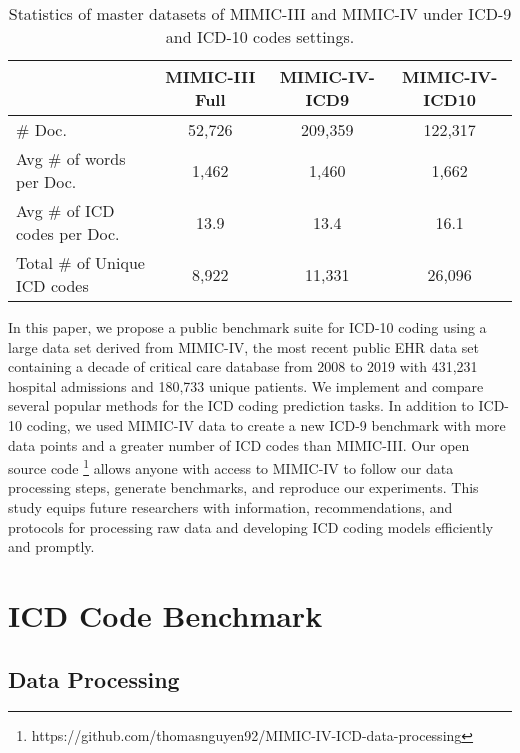 \documentclass[11pt]{article}
\begin{document}
\begin{table*}[ht]
    \centering
    \small
    \begin{tabular}{lccc}
    \toprule
    & MIMIC-III Full & MIMIC-IV-ICD9 & MIMIC-IV-ICD10  \\
    \midrule
    \# Doc. & 52,726 & 209,359 & 122,317 \\
    Avg \# of words per Doc. & 1,462 & 1,460 & 1,662 \\
    Avg \# of ICD codes per Doc. & 13.9 & 13.4 & 16.1 \\ 
    Total \# of Unique ICD codes & 8,922 & 11,331 & 26,096 \\        
    \bottomrule
    
    \end{tabular}
    \caption{Statistics of master datasets of MIMIC-III and MIMIC-IV under ICD-9 and ICD-10 codes settings.}
    \label{tab: statistics-master-dataset}
\end{table*}

In this paper, we propose a public benchmark suite for ICD-10 coding using a large data set derived from MIMIC-IV, the most recent public EHR data set containing a decade of critical care database from 2008 to 2019 with 431,231 hospital admissions and 180,733 unique patients. We implement and compare several popular methods for the ICD coding prediction tasks. In addition to ICD-10 coding, we used MIMIC-IV data to create a new ICD-9 benchmark with more data points and a greater number of ICD codes than MIMIC-III. Our open source code \footnote{https://github.com/thomasnguyen92/MIMIC-IV-ICD-data-processing} allows anyone with access to MIMIC-IV to follow our data processing steps, generate benchmarks, and reproduce our experiments. This study equips future researchers with information, recommendations, and protocols for processing raw data and developing ICD coding models efficiently and promptly.



\section{ICD Code Benchmark}
\subsection{Data Processing}
\end{document}
